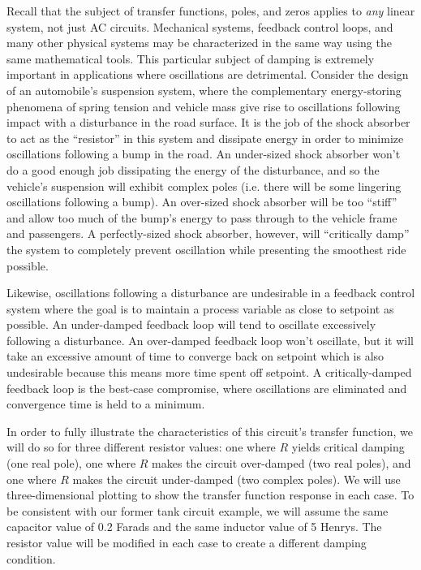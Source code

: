 Recall that the subject of transfer functions, poles, and zeros applies to \textit{any} linear system, not just AC circuits.  Mechanical systems, feedback control loops, and many other physical systems may be characterized in the same way using the same mathematical tools.  This particular subject of damping is extremely important in applications where oscillations are detrimental.  Consider the design of an automobile's suspension system, where the complementary energy-storing phenomena of spring tension and vehicle mass give rise to oscillations following impact with a disturbance in the road surface.  It is the job of the shock absorber to act as the ``resistor'' in this system and dissipate energy in order to minimize oscillations following a bump in the road.  An under-sized shock absorber won't do a good enough job dissipating the energy of the disturbance, and so the vehicle's suspension will exhibit complex poles (i.e. there will be some lingering oscillations following a bump).  An over-sized shock absorber will be too ``stiff'' and allow too much of the bump's energy to pass through to the vehicle frame and passengers.  A perfectly-sized shock absorber, however, will ``critically damp'' the system to completely prevent oscillation while presenting the smoothest ride possible.  
  
Likewise, oscillations following a disturbance are undesirable in a feedback control system where the goal is to maintain a process variable as close to setpoint as possible.  An under-damped feedback loop will tend to oscillate excessively following a disturbance.  An over-damped feedback loop won't oscillate, but it will take an excessive amount of time to converge back on setpoint which is also undesirable because this means more time spent off setpoint.  A critically-damped feedback loop is the best-case compromise, where oscillations are eliminated and convergence time is held to a minimum.  

\vskip 10pt

In order to fully illustrate the characteristics of this circuit's transfer function, we will do so for three different resistor values: one where $R$ yields critical damping (one real pole), one where $R$ makes the circuit over-damped (two real poles), and one where $R$ makes the circuit under-damped (two complex poles).  We will use three-dimensional plotting to show the transfer function response in each case.  To be consistent with our former tank circuit example, we will assume the same capacitor value of 0.2 Farads and the same inductor value of 5 Henrys.  The resistor value will be modified in each case to create a different damping condition.

